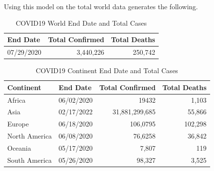 \documentclass{homework}
\begin{document}
Using this model on the total world data generates the following.

\begin{table}[H]
  \caption{COVID19 World End Date and Total Cases}
  \label{Task 2 Results World}
  \centering
  \begin{tabular}{lrr}
    \toprule
    End Date   & Total Confirmed & Total Deaths \\
    \midrule
    07/29/2020 & 3,440,226       & 250,742      \\
    \bottomrule
  \end{tabular}
\end{table}

\begin{table}[H]
  \caption{COVID19 Continent End Date and Total Cases}
  \label{Task 2 Results Continent}
  \centering
  \begin{tabular}{llrr}
    \toprule
    Continent     & End Date   & Total Confirmed & Total Deaths \\
    \midrule
    Africa        & 06/02/2020 & 19432           & 1,103        \\
    Asia          & 02/17/2022 & 31,881,299,685  & 55,866       \\
    Europe        & 06/18/2020 & 106,0795        & 102,298      \\
    North America & 06/08/2020 & 76,6258         & 36,842       \\
    Oceania       & 05/17/2020 & 7,807           & 119          \\
    South America & 05/26/2020 & 98,327          & 3,525        \\
    \bottomrule
  \end{tabular}

\end{table}

\newpage
\end{document}
